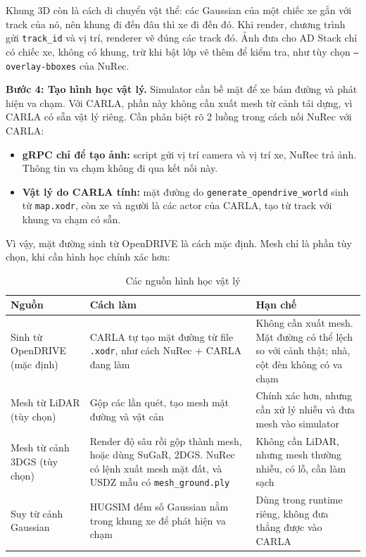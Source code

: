 Khung 3D còn là cách di chuyển vật thể: các Gaussian của một chiếc xe gắn với track của nó, nên khung đi đến đâu thì xe đi đến đó.
Khi render, chương trình gửi \texttt{track\_id} và vị trí, renderer vẽ đúng các track đó. Ảnh đưa cho AD Stack chỉ có chiếc xe, không có khung, trừ khi bật lớp vẽ thêm để kiểm tra, như tùy chọn \texttt{--overlay-bboxes} của NuRec.

\textbf{Bước 4: Tạo hình học vật lý.}
Simulator cần bề mặt để xe bám đường và phát hiện va chạm. Với CARLA, phần này không cần xuất mesh từ cảnh tái dựng, vì CARLA có sẵn vật lý riêng.
Cần phân biệt rõ 2 luồng trong cách nối NuRec với CARLA:
\begin{itemize}
  \item \textbf{gRPC chỉ để tạo ảnh:} script gửi vị trí camera và vị trí xe, NuRec trả ảnh. Thông tin va chạm không đi qua kết nối này.
  \item \textbf{Vật lý do CARLA tính:} mặt đường do \texttt{generate\_opendrive\_world} sinh từ \texttt{map.xodr}, còn xe và người là các actor của CARLA, tạo từ track với khung va chạm có sẵn.
\end{itemize}

Vì vậy, mặt đường sinh từ OpenDRIVE là cách mặc định. Mesh chỉ là phần tùy chọn, khi cần hình học chính xác hơn:

\begin{table}[H]
  \centering
  \small
  \caption{Các nguồn hình học vật lý}
  \begin{tabularx}{\linewidth}{>{\raggedright\arraybackslash}p{3cm} >{\raggedright\arraybackslash}X >{\raggedright\arraybackslash}X}
    \toprule
    \textbf{Nguồn} & \textbf{Cách làm} & \textbf{Hạn chế} \\
    \midrule
    Sinh từ OpenDRIVE (mặc định) & CARLA tự tạo mặt đường từ file \texttt{.xodr}, như cách NuRec + CARLA đang làm & Không cần xuất mesh. Mặt đường có thể lệch so với cảnh thật; nhà, cột đèn không có va chạm \\
    \addlinespace
    Mesh từ LiDAR (tùy chọn) & Gộp các lần quét, tạo mesh mặt đường và vật cản & Chính xác hơn, nhưng cần xử lý nhiễu và đưa mesh vào simulator \\
    \addlinespace
    Mesh từ cảnh 3DGS (tùy chọn) & Render độ sâu rồi gộp thành mesh, hoặc dùng SuGaR, 2DGS. NuRec có lệnh xuất mesh mặt đất, và USDZ mẫu có \texttt{mesh\_ground.ply} & Không cần LiDAR, nhưng mesh thường nhiễu, có lỗ, cần làm sạch \\
    \addlinespace
    Suy từ cảnh Gaussian & HUGSIM đếm số Gaussian nằm trong khung xe để phát hiện va chạm & Dùng trong runtime riêng, không đưa thẳng được vào CARLA \\
    \bottomrule
  \end{tabularx}
\end{table}

